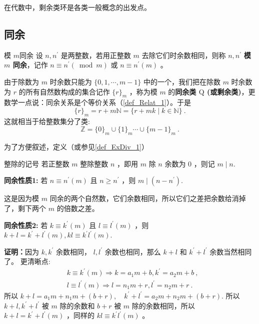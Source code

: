 
在代数中，剩余类环是各类一般概念的出发点。
\subsection{同余}
\begin{definition}{模 $m$同余}\label{def_RRing_1}
设 $n, n^{\prime}$ 是两整数，若用正整数 $m$ 去除它们时余数相同，则称 $n, n^{\prime}$ \textbf{模 $m$ 同余}，记作 $n \equiv n^{\prime}(\bmod m)$ 或 $n \equiv n^{\prime}(m)$ 。 
\end{definition} 
由于除数为 $m$ 时余数只能为 $\{0,1, \cdots, m-1\}$ 中的一个，我们把在除数 $m$ 时余数为 $r$ 的所有自然数构成的集合记作 $\{r\}_m$ ，称为模 $m$ 的\textbf{同余类 $\mathrm{Q}$ (或剩余类)}，更数学一点说：同余关系是个等价关系（\autoref{def_Relat_1}）。于是
\begin{equation}
\{r\}_m=r+m \mathbb{N}=\{r+m k \mid k \in \mathbb{N}\}~.
\end{equation}
这就相当于给整数集分了类:
\begin{equation}
\mathbb{Z}=\{0\}_m \cup\{1\}_m \cdots \cup\{m-1\}_m~.
\end{equation}

为了方便叙述，定义（或参见\autoref{def_ExDiv_1}）
\begin{definition}{整除的记号}
若正整数 $m$ 整除整数 $n$ ，即用 $m$ 除 $n$ 余数为 0 ，则记 $m \mid n$.
\end{definition}
\textbf{同余性质1:} 若 $n \equiv n^{\prime}(m)$ 且 $n \geq n^{\prime}$ ，则 $m \mid\left(n-n^{\prime}\right)$.

这是因为模 $m$ 同余的两个自然数，它们余数相同，所以它们之差把余数给消掉了，剩下两个 $m$ 的倍数之差。

\textbf{同余性质2:} 若 $k \equiv k^{\prime}(m)$ 且 $l \equiv l^{\prime}(m)$ ，则 $k+l=k^{\prime}+l^{\prime}(m), k l \equiv k^{\prime} l^{\prime}(m)$.

\textbf{证明：}因为 $k, k^{\prime}$ 余数相同， $l, l^{\prime}$ 余数也相同，那么 $k+l$ 和 $k^{\prime}+l^{\prime}$ 余数当然相同了。
更清晰点:
\begin{equation}
\begin{aligned}
& k \equiv k^{\prime}(m) \Rightarrow k=a_1 m+b, k^{\prime}=a_2 m+b~, \\
& l \equiv l^{\prime}(m) \Rightarrow l=n_1 m+r, l^{\prime}=n_2 m+r~.
\end{aligned}
\end{equation}
所以 $k+l=a_1 m+n_1 m+(b+r), \quad k^{\prime}+l^{\prime}=a_2 m+n_2 m+(b+r).$
所以 $k+l, k^{\prime}+l^{\prime}$ 被 $m$ 除的余数和 $b+r$ 被 $m$ 除的余数相同，所以 $k+l=k^{\prime}+l^{\prime}(m)$
，同样的 $k l \equiv k^{\prime} l^{\prime}(m)$ 。

